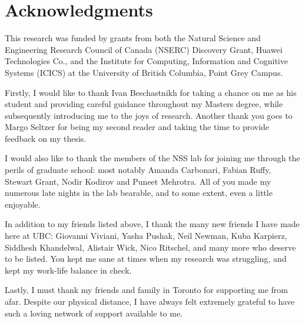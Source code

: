 
\chapter{Acknowledgments}

This research was funded by grants from both the Natural Science and
Engineering Research Council of Canada (NSERC) Discovery Grant, Huawei
Technologies Co., and the Institute for Computing, Information and
Cognitive Systems (ICICS) at the University of British Columbia, Point
Grey Campus.

Firstly, I would like to thank Ivan Beschastnikh for taking a chance
on me as his student and providing careful guidance throughout my
Masters degree, while subsequently introducing me to the joys of
research. Another thank you goes to Margo Seltzer for being my second
reader and taking the time to provide feedback on my thesis.

I would also like to thank the members of the NSS lab for joining me
through the perils of graduate school: most notably Amanda Carbonari,
Fabian Ruffy, Stewart Grant, Nodir Kodirov and Puneet Mehrotra. All of
you made my numerous late nights in the lab bearable, and to some
extent, even a little enjoyable.

In addition to my friends listed above, I thank the many new friends I
have made here at UBC: Giovanni Viviani, Yasha Pushak, Neil Newman,
Kuba Karpierz, Siddhesh Khandelwal, Alistair Wick, Nico Ritschel, and
many more who deserve to be listed. You kept me sane at times when my
research was struggling, and kept my work-life balance in check. 

Lastly, I must thank my friends and family in Toronto for supporting
me from afar. Despite our physical distance, I have always felt
extremely grateful to have such a loving network of support available
to me.
